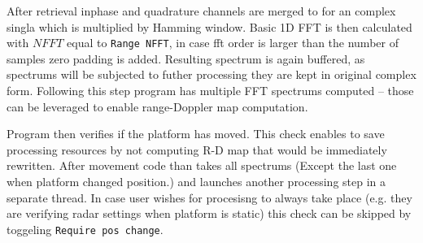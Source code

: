 After retrieval inphase and quadrature channels are merged to for an complex singla which is multiplied by Hamming window.
Basic 1D FFT is then calculated with $NFFT$ equal to \texttt{Range NFFT}, in case fft order is larger than the number of samples zero padding is added.
Resulting spectrum is again buffered, as spectrums will be subjected to futher processing they are kept in original complex form.
Following this step program has multiple FFT spectrums computed -- those can be leveraged to enable range-Doppler map computation.

Program then verifies if the platform has moved.
This check enables to save processing resources by not computing R-D map that would be immediately rewritten.
After movement code than takes all spectrums (Except the last one when platform changed position.) and launches another processing step in a separate thread.
In case user wishes for procesisng to always take place (e.g. they are verifying radar settings when platform is static) this check can be skipped by toggeling \texttt{Require pos change}.



